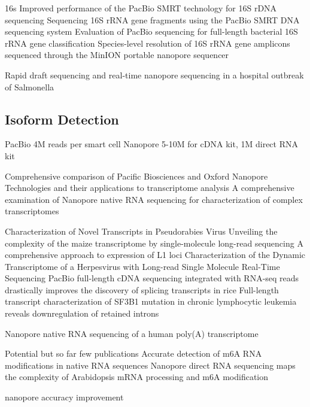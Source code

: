 16s
Improved performance of the PacBio SMRT technology for 16S rDNA sequencing \cite{Mosher2014}
Sequencing 16S rRNA gene fragments using the PacBio SMRT DNA sequencing system \cite{Schloss2016}
Evaluation of PacBio sequencing for full-length bacterial 16S rRNA gene classification \cite{Wagner2016}
Species-level resolution of 16S rRNA gene amplicons sequenced through the MinION portable nanopore sequencer \cite{Benitez-Paez2016}

Rapid draft sequencing and real-time nanopore sequencing in a hospital outbreak of Salmonella \cite{Quick2015}





\subsection{Isoform Detection}
\label{subsec:state_of_art:isoform}

PacBio 4M reads per smart cell
Nanopore 5-10M for cDNA kit, 1M direct RNA kit

Comprehensive comparison of Pacific Biosciences and Oxford Nanopore Technologies and their applications to transcriptome analysis \cite{Weirather2017}
A comprehensive examination of Nanopore native RNA sequencing for characterization of complex transcriptomes \cite{Soneson2019}

Characterization of Novel Transcripts in Pseudorabies Virus \cite{Tombacz2015}
Unveiling the complexity of the maize transcriptome by single-molecule long-read sequencing \cite{Wang2016}
A comprehensive approach to expression of L1 loci \cite{Deininger2017}
Characterization of the Dynamic Transcriptome of a Herpesvirus with Long-read Single Molecule Real-Time Sequencing \cite{Tombacz2017}
PacBio full-length cDNA sequencing integrated with RNA-seq reads drastically improves the discovery of splicing transcripts in rice \cite{Zhang2019a}
Full-length transcript characterization of SF3B1 mutation in chronic lymphocytic leukemia reveals downregulation of retained introns \cite{Tang2020}

Nanopore native RNA sequencing of a human poly(A) transcriptome \cite{Workman2019}

Potential but so far few publications
Accurate detection of m6A RNA modifications in native RNA sequences \cite{Liu2019}
Nanopore direct RNA sequencing maps the complexity of Arabidopsis mRNA processing and m6A modification \cite{Parker2020}

nanopore accuracy improvement




